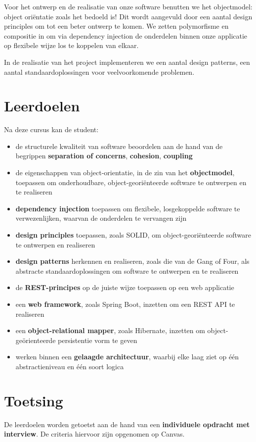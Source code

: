 \documentclass[dutch,a4paper,12pt,doubleside]{book}
\begin{document}
Voor het ontwerp en de realisatie van onze software benutten we 
het objectmodel: object oriëntatie zoals het bedoeld is! 
Dit wordt aangevuld door een aantal design principles om tot een 
beter ontwerp te komen. We zetten polymorfisme en compositie in 
om via dependency injection de onderdelen binnen onze applicatie 
op flexibele wijze los te koppelen van elkaar.

In de realisatie van het project implementeren we een aantal
design patterns, een aantal standaardoplossingen voor 
veelvoorkomende problemen.

\section*{Leerdoelen}
Na deze cursus kan de student:
\begin{itemize}
    \item de structurele kwaliteit van software beoordelen aan de hand van de begrippen \textbf{separation of concerns}, \textbf{cohesion}, \textbf{coupling}
    \item de eigenschappen van object-orientatie, in de zin van het \textbf{objectmodel}, toepassen om onderhoudbare, object-georiënteerde software te ontwerpen en te realiseren
    \item \textbf{dependency injection} toepassen om flexibele, losgekoppelde software te verwezenlijken, waarvan de onderdelen te vervangen zijn
    \item \textbf{design principles} toepassen, zoals SOLID, om object-georiënteerde software te ontwerpen en realiseren
    \item \textbf{design patterns} herkennen en realiseren, zoals die van de Gang of Four, als abstracte standaardoplossingen om software te ontwerpen en te realiseren
    \item de \textbf{REST-principes} op de juiste wijze toepassen op een web applicatie
    \item een \textbf{web framework}, zoals Spring Boot, inzetten om een REST API te realiseren
    \item een \textbf{object-relational mapper}, zoals Hibernate, inzetten om object-geörienteerde persistentie vorm te geven
    \item werken binnen een \textbf{gelaagde architectuur}, waarbij elke laag ziet op één abstractieniveau en één soort logica
\end{itemize}

\section*{Toetsing}
De leerdoelen worden getoetst aan de hand van een \textbf{individuele opdracht met interview}.
De criteria hiervoor zijn opgenomen op Canvas. 
\end{document}
